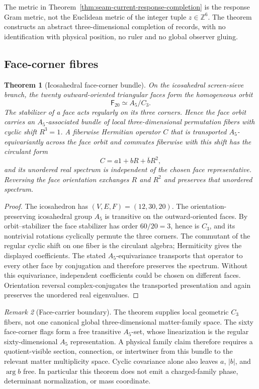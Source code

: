 \documentclass[11pt]{article}
\newtheorem{theorem}{Theorem}[section]
\theoremstyle{remark}
\newtheorem{remark}[theorem]{Remark}
\theoremstyle{plain}
\begin{document}
The metric in Theorem~\ref{thm:seam-current-response-completion} is the
response Gram metric, not the Euclidean metric of the integer tuple
\(z\in\mathbb Z^6\). The theorem constructs an abstract three-dimensional
completion of records, with no identification with physical position, no
ruler and no global observer gluing.

\subsection{Face-corner fibres}

\begin{theorem}[Icosahedral face-corner bundle]
\label{thm:icosahedral-face-corner-bundle}
On the icosahedral screen-sieve branch, the twenty outward-oriented triangular
faces form the homogeneous orbit
\[
\mathsf F_{20}\simeq A_5/C_3.
\]
The stabilizer of a face acts regularly on its three corners.  Hence the face
orbit carries an \(A_5\)-associated bundle of local three-dimensional
permutation fibers with cyclic shift \(R^3=1\).  A fiberwise Hermitian operator
\(C\) that is transported \(A_5\)-equivariantly across the face orbit and
commutes fiberwise with this shift has the circulant form
\[
C=a1+bR+\overline bR^2,
\]
and its unordered real spectrum is independent of the chosen face
representative.  Reversing the face orientation exchanges \(R\) and \(R^2\)
and preserves that unordered spectrum.
\end{theorem}

\begin{proof}
The icosahedron has \((V,E,F)=(12,30,20)\).  The orientation-preserving
icosahedral group \(A_5\) is transitive on the outward-oriented faces.  By
orbit--stabilizer the face stabilizer has order \(60/20=3\), hence is
\(C_3\), and its nontrivial rotations cyclically permute the three corners.
The commutant of the regular cyclic shift on one fiber is the circulant
algebra; Hermiticity gives the displayed coefficients.  The stated
\(A_5\)-equivariance transports that operator to every other face by
conjugation and therefore preserves the spectrum.  Without this equivariance,
independent coefficients could be chosen on different faces.  Orientation
reversal complex-conjugates the transported presentation and again preserves
the unordered real eigenvalues.
\end{proof}

\begin{remark}[Face-carrier boundary]
The theorem supplies local geometric \(C_3\) fibers, not one canonical global
three-dimensional matter-family space.  The sixty face-corner flags form a
free transitive \(A_5\)-set, whose linearization is the regular
sixty-dimensional \(A_5\) representation.  A physical family claim therefore
requires a quotient-visible section, connection, or intertwiner from this
bundle to the relevant matter multiplicity space.  Cyclic covariance alone
also leaves \(a\), \(|b|\), and \(\arg b\) free.  In particular this theorem
does not emit a charged-family phase, determinant normalization, or mass
coordinate.
\end{remark}
\end{document}

